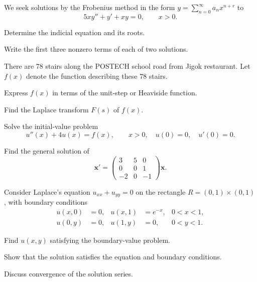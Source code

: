 \documentclass[11pt,oneside]{article}
\begin{document}
\begin{problem}
We seek solutions by the Frobenius method in the form $\displaystyle y=\sum_{n=0}^\infty a_nx^{n+r}$ to
\[
5xy''+y'+xy=0,\qquad x>0.
\]
\begin{problemsubparts}
\item Determine the indicial equation and its roots.
\item Write the first three nonzero terms of each of two solutions.
\end{problemsubparts}
\end{problem}

\begin{problem}
There are $78$ stairs along the POSTECH school road from Jigok restaurant. Let $f(x)$ denote the function describing these $78$ stairs.
\begin{problemsubparts}
\item Express $f(x)$ in terms of the unit-step or Heaviside function.
\item Find the Laplace transform $F(s)$ of $f(x)$.
\item Solve the initial-value problem
\[
u''(x)+4u(x)=f(x),\qquad x>0,\quad u(0)=0,\quad u'(0)=0.
\]
\end{problemsubparts}
\end{problem}

\begin{problem}
Find the general solution of
\[
\mathbf x'=\begin{pmatrix}3&5&0\\0&0&1\\-2&0&-1\end{pmatrix}\mathbf x.
\]
\end{problem}

\begin{problem}
Consider Laplace's equation $u_{xx}+u_{yy}=0$ on the rectangle $R=(0,1)\times(0,1)$, with boundary conditions
\[
\begin{aligned}
u(x,0)&=0,&u(x,1)&=e^{-x},&0<x<1,\\
u(0,y)&=0,&u(1,y)&=0,&0<y<1.
\end{aligned}
\]
\begin{problemsubparts}
\item Find $u(x,y)$ satisfying the boundary-value problem.
\item Show that the solution satisfies the equation and boundary conditions.
\item Discuss convergence of the solution series.
\end{problemsubparts}
\end{problem}
\end{document}
